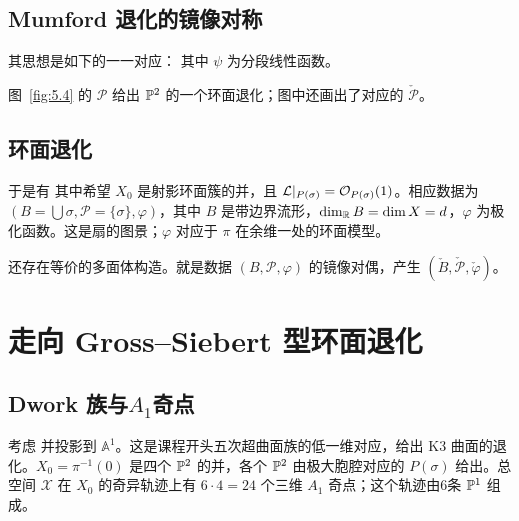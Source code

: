 \subsection{Mumford 退化的镜像对称}
其思想是如下的一一对应：
其中 $\psi$ 为分段线性函数。
\begin{example}\label{ex:5.4}
图~\ref{fig:5.4} 的 $\mathscr P$ 给出 $\mathbb P^2$ 的一个环面退化；图中还画出了对应的 $\check{\mathscr P}$。
\end{example}
\subsection{环面退化}
于是有
其中希望 $X_0$ 是射影环面簇的并，且 $\mathcal L|_{P(\sigma)}=\mathcal O_{P(\sigma)}(1)$。相应数据为 $(B=\bigcup\sigma,\mathscr P=\{\sigma\},\varphi)$，其中 $B$ 是带边界流形，$\dim_{\mathbb R} B=\dim X=d$，$\varphi$ 为极化函数。这是扇的图景；$\varphi$ 对应于 $\pi$ 在余维一处的环面模型。

还存在等价的多面体构造。就是数据 $(B,\mathscr P,\varphi)$ 的镜像对偶，产生 $(\check B,\check{\mathscr P},\check\varphi)$。
\section{走向 Gross–Siebert 型环面退化}
\subsection{Dwork 族与\texorpdfstring{$A_1$}{A₁}奇点}
考虑
并投影到 $\mathbb A^1$。这是课程开头五次超曲面族的低一维对应，给出 K3 曲面的退化。$X_0=\pi^{-1}(0)$ 是四个 $\mathbb P^2$ 的并，各个 $\mathbb P^2$ 由极大胞腔对应的 $P(\sigma)$ 给出。总空间 $\mathcal X$ 在 $X_0$ 的奇异轨迹上有 $6\cdot4=24$ 个三维 $A_1$ 奇点；这个轨迹由6条 $\mathbb P^1$ 组成。

